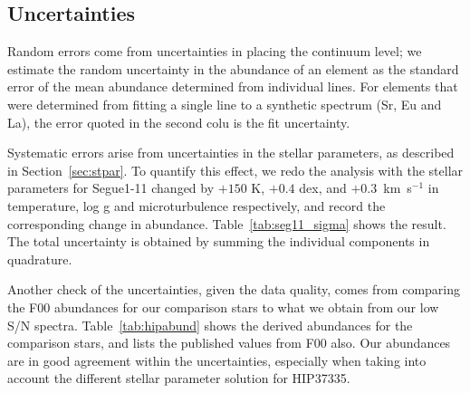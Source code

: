 \documentclass{emulateapj}
\begin{document}
\subsection{Uncertainties}
\label{sec:unc}
Random errors come from uncertainties in placing the continuum level; we estimate the random uncertainty in the abundance of an element as the standard error of the mean abundance determined from individual lines. For elements that were determined from fitting a single line to a synthetic spectrum (Sr, Eu and La), the error quoted in the second colu
 is the fit uncertainty.

Systematic errors arise from uncertainties in the stellar parameters, as described in Section~\ref{sec:stpar}. To quantify this effect, we redo the analysis with the stellar parameters for Segue1-11 changed by $+150$ K, $+0.4$ dex, and $+0.3$~km~s$^{-1}$ in temperature, log g and microturbulence respectively, and record the corresponding change in abundance. Table~\ref{tab:seg11_sigma} shows the result. The total uncertainty is obtained by summing the individual components in quadrature.

Another check of the uncertainties, given the data quality, comes from comparing the F00 abundances for our comparison stars to what we obtain from our low S/N spectra. Table~\ref{tab:hipabund} shows the derived abundances for the comparison stars, and lists the published values from F00 also. Our abundances are in good agreement within the uncertainties, especially when taking into account the different stellar parameter solution for HIP37335. 

\end{document}
